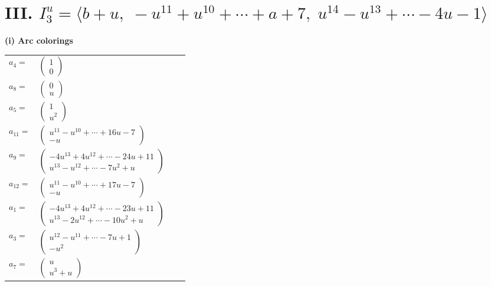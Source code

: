 \documentclass[1p]{elsarticle_modified}
\theoremstyle{definition}
\begin{document}
\centering \section*{III. $I^u_{3}= \langle b+u,\;- u^{11}+u^{10}+\cdots+a+7,\;u^{14}- u^{13}+\cdots-4 u-1 \rangle$}
\flushleft \textbf{(i) Arc colorings}\\
\begin{tabular}{m{7pt} m{180pt} m{7pt} m{180pt} }
\flushright $a_{4}=$&$\begin{pmatrix}1\\0\end{pmatrix}$ \\
\flushright $a_{8}=$&$\begin{pmatrix}0\\u\end{pmatrix}$ \\
\flushright $a_{5}=$&$\begin{pmatrix}1\\u^2\end{pmatrix}$ \\
\flushright $a_{11}=$&$\begin{pmatrix}u^{11}- u^{10}+\cdots+16 u-7\\- u\end{pmatrix}$ \\
\flushright $a_{9}=$&$\begin{pmatrix}-4 u^{13}+4 u^{12}+\cdots-24 u+11\\u^{13}- u^{12}+\cdots-7 u^2+u\end{pmatrix}$ \\
\flushright $a_{12}=$&$\begin{pmatrix}u^{11}- u^{10}+\cdots+17 u-7\\- u\end{pmatrix}$ \\
\flushright $a_{1}=$&$\begin{pmatrix}-4 u^{13}+4 u^{12}+\cdots-23 u+11\\u^{13}-2 u^{12}+\cdots-10 u^2+u\end{pmatrix}$ \\
\flushright $a_{3}=$&$\begin{pmatrix}u^{12}- u^{11}+\cdots-7 u+1\\- u^2\end{pmatrix}$ \\
\flushright $a_{7}=$&$\begin{pmatrix}u\\u^3+u\end{pmatrix}$ \\

\end{tabular}
\end{document}
